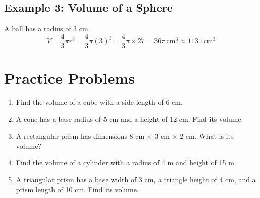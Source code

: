 \documentclass[12pt,a4paper]{article}
\begin{document}
\subsection*{Example 3: Volume of a Sphere}
A ball has a radius of 3 cm.  
\[
V = \frac{4}{3} \pi r^3 = \frac{4}{3} \pi (3)^3 = \frac{4}{3} \pi \times 27 = 36 \pi \, \text{cm}^3 \approx 113.1 \text{cm}^3
\]  

\section*{Practice Problems}

\begin{enumerate}
    \item Find the volume of a cube with a side length of 6 cm.
    \item A cone has a base radius of 5 cm and a height of 12 cm. Find its volume.
    \item A rectangular prism has dimensions 8 cm \(\times\) 3 cm \(\times\) 2 cm. What is its volume?
    \item Find the volume of a cylinder with a radius of 4 m and height of 15 m.  
    \item A triangular prism has a base width of 3 cm, a triangle height of 4 cm, and a prism length of 10 cm. Find its volume.
\end{enumerate}
\end{document}
